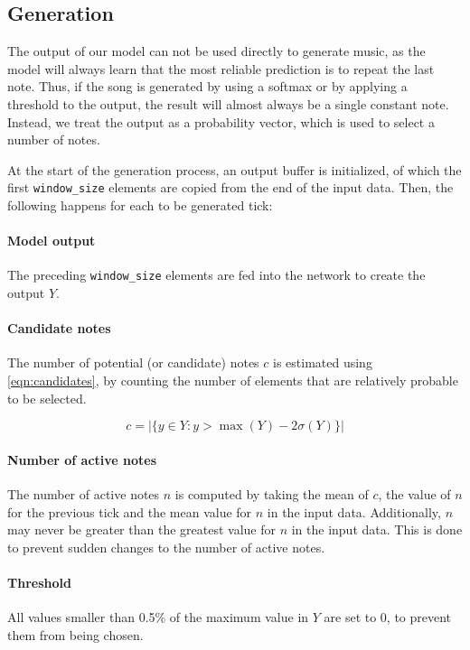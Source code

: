 \documentclass[11pt, twocolumn]{article}
\begin{document}
\subsection{Generation}
The output of our model can not be used directly to generate music, as the model will always learn that the most reliable prediction is to repeat the last note. Thus, if the song is generated by using a softmax or by applying a threshold to the output, the result will almost always be a single constant note. Instead, we treat the output as a probability vector, which is used to select a number of notes.

At the start of the generation process, an output buffer is initialized, of which the first \texttt{window\_size} elements are copied from the end of the input data. Then, the following happens for each to be generated tick:

\paragraph{Model output} The preceding \texttt{window\_size} elements are fed into the network to create the output $Y$. 

\paragraph{Candidate notes} The number of potential (or candidate) notes $c$ is estimated using \autoref{eqn:candidates}, by counting the number of elements that are relatively probable to be selected.

\begin{equation}\label{eqn:candidates}
    c = \lvert \{ y \in Y : y > \max(Y) - 2\sigma(Y) \} \rvert
\end{equation}


\paragraph{Number of active notes} The number of active notes $n$ is computed by taking the mean of $c$, the value of $n$ for the previous tick and the mean value for $n$ in the input data. Additionally, $n$ may never be greater than the greatest value for $n$ in the input data. This is done to prevent sudden changes to the number of active notes.

\paragraph{Threshold} All values smaller than 0.5\% of the maximum value in $Y$ are set to 0, to prevent them from being chosen.
\end{document}
